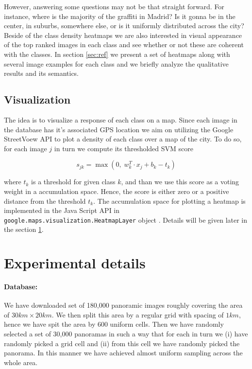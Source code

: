 \documentclass[runningheads, table]{llncs}
\begin{document}
However, answering some questions may not be that straight forward. For instance, where is the majority of the graffiti in Madrid? Is it gonna be in the center, in suburbs, somewhere else, or is it uniformly distributed across the city? Beside of the class density heatmaps we are also interested in visual appearance of the top ranked images in each class and see whether or not these are coherent with the classes. In section \ref{sec:ref} we present a set of heatmaps along with several image examples for each class and we briefly analyze the qualitative results and its semantics. 

\subsection{Visualization}
\vspace{-1mm}
The idea is to visualize a response of each class on a map. Since each image in the database has it's associated GPS location we aim on utilizing the Google StreetVoew API \cite{googleAPI} to plot a density of each class over a map of the city. To do so, for each image $j$ in turn we compute its thresholded SVM score 

\begin{equation}
  s_{jk} = \operatorname{max}\left(0, \; w_k^T \cdot x_j+b_k - t_k\right) 
\end{equation}

\noindent
where $t_k$ is a threshold for given class $k$, and than we use this score as a voting weight in a accumulation space. Hence, the score is either zero or a positive distance from the threshold $t_k$. The accumulation space for plotting a heatmap is implemented in the Java Script API in \texttt{google.maps.vi\-su\-aliza\-tion.Heat\-map\-Layer} object \cite{googleAPI}. Details will be given later in the section \ref{sec:exprm}.

\section{Experimental details}
\label{sec:exprm}



  \paragraph{Database:}
  We have downloaded set of 180,000 panoramic images \cite{Gronat11} roughly covering the area of $30km \times 20km$. We then split this area by a regular grid with spacing of $1km$, hence we have spit the area by 600 uniform cells. Then we have randomly selected a set of 30,000 panoramas in such a way that for each in turn we (i) have randomly picked a grid cell and (ii) from this cell we have randomly picked the panorama. In this manner we have achieved almost uniform sampling across the whole area.
\end{document}

